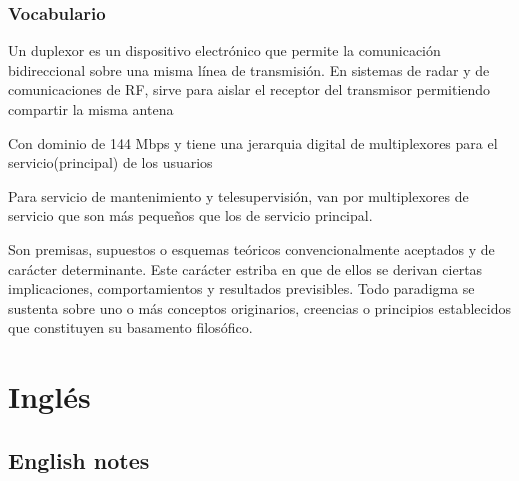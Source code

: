 \documentclass[
	12pt, %
	fleqn, %
	a4paper, %
]{LegrandOrangeBook}
\begin{document}
\section*{Vocabulario}
\begin{vocabulary}[Duplexer]
Un duplexor es un dispositivo electrónico que permite la comunicación bidireccional sobre una misma línea de transmisión. En sistemas de radar y de comunicaciones de RF, sirve para aislar el receptor del transmisor permitiendo compartir la misma antena
\end{vocabulary}
\begin{vocabulary}
Con dominio de 144 Mbps y tiene una jerarquia digital de multiplexores para el servicio(principal) de los usuarios
\end{vocabulary}
\begin{vocabulary}
Para servicio de mantenimiento y telesupervisión, van por multiplexores de servicio que son más pequeños que los de servicio principal.
\end{vocabulary}
\begin{vocabulary}[Paradigma]
Son premisas, supuestos o esquemas teóricos convencionalmente aceptados y de carácter determinante. Este carácter estriba en que de ellos se derivan ciertas implicaciones, comportamientos y resultados previsibles. Todo paradigma se sustenta sobre uno o más conceptos originarios, creencias o principios establecidos que constituyen su basamento filosófico.
\end{vocabulary}
\part{Inglés}
\chapter{English notes}
\end{document}
